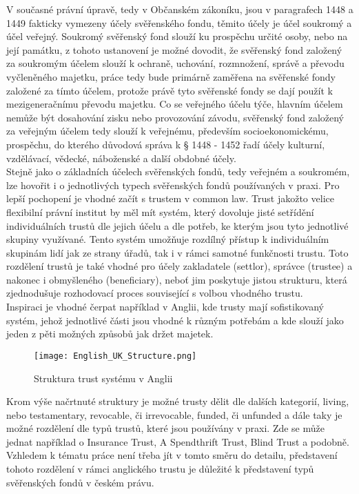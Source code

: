 \documentclass{article}
\begin{document}
\indent V současné právní úpravě, tedy v Občanském zákoníku, jsou v paragrafech 1448 a 1449 fakticky vymezeny účely svěřenského fondu, těmito účely je účel soukromý a účel veřejný. Soukromý svěřenský fond slouží ku prospěchu určité osoby, nebo na její památku, z tohoto ustanovení je možné dovodit, že svěřenský fond založený za soukromým účelem slouží k ochraně, uchování, rozmnožení, správě a převodu vyčleněného majetku, práce tedy bude primárně zaměřena na svěřenské fondy založené za tímto účelem, protože právě tyto svěřenské fondy se dají použít k mezigeneračnímu převodu majetku. Co se veřejného účelu týče, hlavním účelem nemůže být dosahování zisku nebo provozování závodu, svěřenský fond založený za veřejným účelem tedy slouží k veřejnému, především socioekonomickému, prospěchu, do kterého důvodová správa k § 1448 - 1452 řadí účely kulturní, vzdělávací, vědecké, náboženské a další obdobné účely. \\

Stejně jako o základních účelech svěřenských fondů, tedy veřejném a soukro\-mém, lze hovořit i o jednotlivých typech svěřenských fondů používaných v praxi. Pro lepší pochopení je vhodné začít s trustem v common law. Trust jakožto velice flexibilní právní institut by měl mít systém, který dovoluje jisté setřídění individuálních trustů dle jejich účelu a dle potřeb, ke kterým jsou tyto jednotlivé skupiny využívané. Tento systém umožňuje rozdílný přístup k individuálním skupinám lidí jak ze strany úřadů, tak i v rámci samotné funkčnosti trustu. Toto rozdělení trustů je také vhodné pro účely zakladatele (settlor), správce (trustee) a nakonec i obmyšleného (beneficiary), neboť jim poskytuje jistou strukturu, která zjednodušuje rozhodovací proces související s volbou vhodného trustu.\\

Inspiraci je vhodné čerpat například v Anglii, kde trusty mají sofistikovaný systém, jehož jednotlivé části jsou vhodné k různým potřebám a kde slouží jako jeden z pěti možných způsobů jak držet majetek.\\

\begin{figure}[h]
\centering
\texttt{[image: English\_UK\_Structure.png]}
\caption{Struktura trust systému v Anglii}
\label{fig:struktura}
\end{figure}

Krom výše načrtnuté struktury je možné trusty dělit dle dalších kategorií, living, nebo testamentary, revocable, či irrevocable, funded, či unfunded a dále taky je možné rozdělení dle typů trustů, které jsou používány v praxi. Zde se může jednat například o Insurance Trust, A Spendthrift Trust, Blind Trust a podobně. Vzhledem k tématu práce není třeba jít v tomto směru do detailu, představení tohoto rozdělení v rámci anglického trustu je důležité k představení typů svěřenských fondů v českém právu.\\
\end{document}

